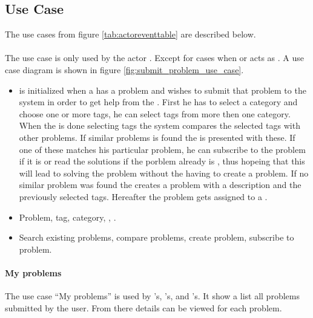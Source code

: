 \subsection{Use Case}
\label{sec:usecase}

The use cases from figure \ref{tab:actoreventtable} are described below.  

\paragraph{\ucsproblem[c]} The use case \ucsproblem[] is only used by the actor \aclient. Except for cases when \astaff{} or \sadmin{}  acts as \aclient{}. A use case diagram is shown in figure \ref{fig:submit_problem_use_case}. 
\begin{itemize}
\item {} \ucsproblem[c] is initialized when a \aclient{} has a problem and wishes to submit that problem to the system in order to get help from the \astaff{}. 
First he has to select a category and choose one or more tags, he can select tags from more then one category. 
When the \aclient{} is done selecting tags the system compares the selected tags with other problems. 
If similar problems is found the \aclient{} is presented with these.
If one of these matches his particular problem, he can subscribe to the problem if it is \open or read the solutions if the porblem already is \closed{}, thus hopeing that this will lead to solving the problem without the \aclient[] having to create a problem.
If no similar problem was found the \aclient{} creates a problem with a description and the previously selected tags. 
Hereafter the problem gets assigned to a \astaff{}. 

\item {} Problem, tag, category, \aclient[], \astaff[].

\item {} Search existing problems, compare problems, create problem, subscribe to problem. 
\end{itemize}

\paragraph{My problems} The use case ``My problems'' is used by  \aclient 's, \astaff 's, and \admin 's. It show a list all problems submitted by the user. From there details can be viewed for each problem. 

